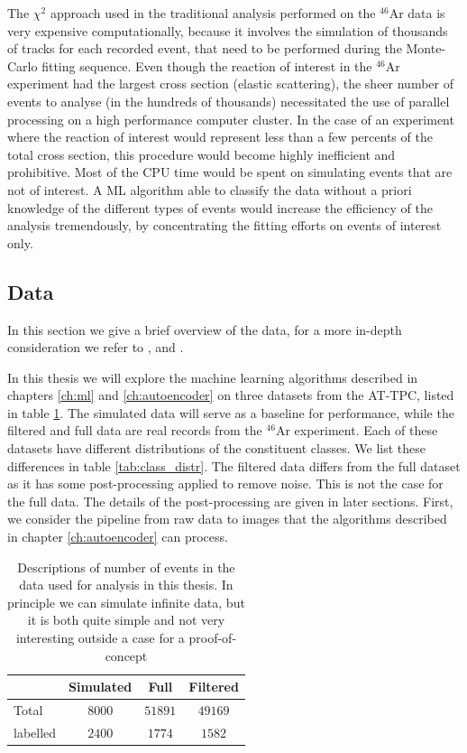 \documentclass[preprint,12pt]{elsarticle}
\begin{document}
The $\chi^2$ approach used in the traditional analysis performed on the $^{46}$Ar data is very expensive computationally, because it involves the simulation of thousands of tracks for each recorded event, that need to be performed during the Monte-Carlo fitting sequence. Even though the reaction of interest in the $^{46}$Ar experiment had the largest cross section (elastic scattering), the sheer number of events to analyse (in the hundreds of thousands) necessitated the use of parallel processing on a high performance computer cluster. In the case of an experiment where the reaction of interest would represent less than a few percents of the total cross section, this procedure would become highly inefficient and prohibitive. Most of the CPU time would be spent on simulating events that are not of interest. A ML algorithm able to classify the data without a priori knowledge of the different types of events would increase the efficiency of the analysis tremendously, by concentrating the fitting efforts on events of interest only.

\subsection{Data}
 In this section we give a brief overview of the data, for a more in-depth consideration we refer to \cite{Mittig2015}, \cite{Suzuki2012} and  \cite{Bradt2017a}. 

In this thesis we will explore the machine learning algorithms described in chapters \ref{ch:ml} and \ref{ch:autoencoder} on three datasets from the AT-TPC, listed in table \ref{tab:datasets}. The simulated data will serve as a baseline for performance, while the filtered and full data are real records from the ${}^{46}$Ar experiment. Each of these datasets have different distributions of the constituent classes. We list these differences in table \ref{tab:class_distr}. The filtered data differs from the full dataset as it has some post-processing applied to remove noise. This is not the case for the full data. The details of the post-processing are given in later sections. First, we consider the pipeline from raw data to images that the algorithms described in chapter \ref{ch:autoencoder} can process. 

\begin{table}
\centering
\caption{Descriptions of number of events in the data used for analysis in this thesis. In principle we can simulate infinite data, but it is both quite simple and not very interesting outside a case for a proof-of-concept}\label{tab:datasets}
\begin{tabular}{lccc}
\toprule
{} & Simulated & Full & Filtered \\
\midrule
Total &  $8000$ & $51891$ & $49169$ \\
labelled & $2400$ & $1774$ &  $1582$ \\ 
\bottomrule
\end{tabular}
\end{table}
\end{document}
